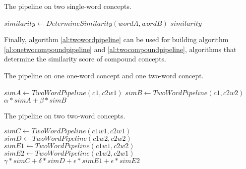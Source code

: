 \documentclass{article}
\begin{document}
\begin{algorithm}
\caption{The pipeline on two single-word concepts.}\label{al:twowordpipeline}
\begin{algorithmic}[1]
		\State $\textit{similarity} \gets \textit{DetermineSimilarity}(wordA, wordB)$
				\State {}
			\EndIf
		\EndIf
		\State \Return $\textit{similarity}$
	\EndProcedure
\end{algorithmic}
\end{algorithm}

Finally, algorithm \ref{al:twowordpipeline} can be used for building algorithm \ref{al:onetwocompoundpipeline} and \ref{al:twocompoundpipeline}, algorithms that determine the similarity score of compound concepts.

\begin{algorithm}
\caption{The pipeline on one one-word concept and one two-word concept.}\label{al:onetwocompoundpipeline}
\begin{algorithmic}[1]
		\State $\textit{simA} \gets \textit{TwoWordPipeline}(c1, c2w1)$
		\State $\textit{simB} \gets \textit{TwoWordPipeline}(c1, c2w2)$
		\State \Return $\alpha * \textit{simA} + \beta * \textit{simB}$
	\EndProcedure
\end{algorithmic}
\end{algorithm}

\begin{algorithm}
\caption{The pipeline on two two-word concepts.}\label{al:twocompoundpipeline}
\begin{algorithmic}[1]
		\State $\textit{simC} \gets \textit{TwoWordPipeline}(c1w1, c2w1)$
		\State $\textit{simD} \gets \textit{TwoWordPipeline}(c1w2, c2w2)$
		\State $\textit{simE1} \gets \textit{TwoWordPipeline}(c1w1, c2w2)$
		\State $\textit{simE2} \gets \textit{TwoWordPipeline}(c1w2, c2w1)$
		\State \Return $\gamma * \textit{simC} + \delta * \textit{simD} + \epsilon * \textit{simE1} + \epsilon * \textit{simE2}$
	\EndProcedure
\end{algorithmic}
\end{algorithm}

\end{document}
